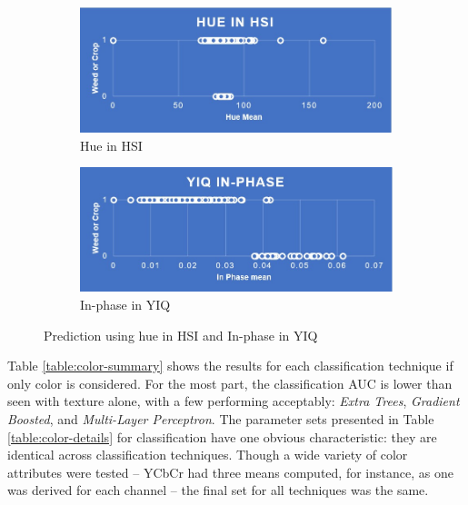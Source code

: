 \documentclass[letterpaper, notitlepage]{report}
\begin{document}
\begin{figure}[H]
	\begin{subfigure}[h]{0.48\linewidth}
		\includegraphics[width=1\linewidth]{./figures/hsi-hue.jpg}
		\caption{Hue in HSI}
		\label{subfig:hue}	
	\end{subfigure}
	\hfill
	\begin{subfigure}[h]{0.48\linewidth}
		\includegraphics[width=1\linewidth]{./figures/yiq-in-phase.jpg}
		\caption{In-phase in YIQ}
		\label{subfig:in_phase}		
	\end{subfigure}%
	\caption[Prediction using hue in \gls{HSI} and In-phase in YIQ]{Prediction using hue in \gls{HSI} and In-phase in YIQ}
	\label{fig:hue_vs_inphase}
\end{figure}

Table \ref{table:color-summary} shows the results for each classification technique if only color is considered. For the most part, the classification AUC is lower than seen with texture alone, with a few performing acceptably: \textit{Extra Trees}, \textit{Gradient Boosted}, and \textit{Multi-Layer Perceptron}.  The parameter sets presented in Table \ref{table:color-details} for classification have one obvious characteristic: they are identical across classification techniques. Though a wide variety of color attributes were tested -- YCbCr had three means computed, for instance, as one was derived for each channel -- the final set for all techniques was the same.
\end{document}
